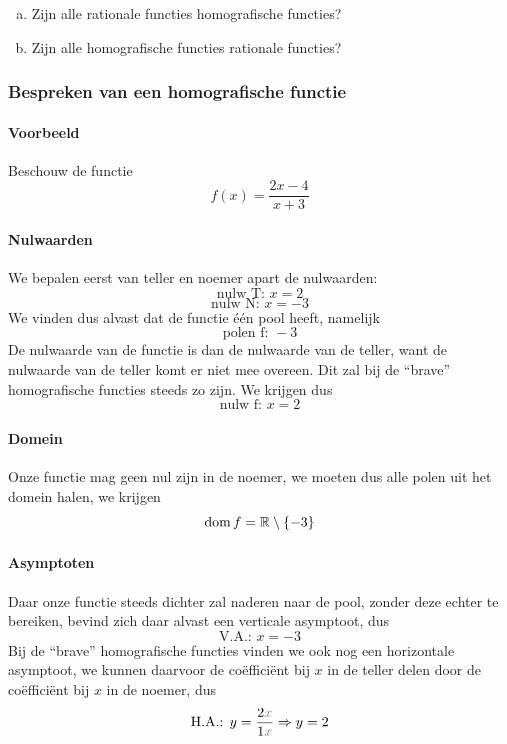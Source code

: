 \documentclass[12pt,twoside,a4paper]{article}
\begin{document}
\begin{oefening}
\begin{enumerate}[(a)]
  \item Zijn alle rationale functies homografische functies?
  \item Zijn alle homografische functies rationale functies?
\end{enumerate}
\end{oefening}

\subsubsection*{Bespreken van een homografische functie}

\paragraph{Voorbeeld} Beschouw de functie
$$f(x)=\dfrac{2x-4}{x+3}$$

\paragraph{Nulwaarden} We bepalen eerst van teller en noemer apart de
nulwaarden:
$$\text{nulw T: } x=2$$
$$\text{nulw N: } x=-3$$
We vinden dus alvast dat de functie één pool heeft, namelijk
$$\text{polen f: } -3$$
De nulwaarde van de functie is dan de nulwaarde van de teller, want de
nulwaarde van de teller komt er niet mee overeen. Dit zal bij de
``brave'' homografische functies steeds zo zijn. We krijgen dus
$$\text{nulw f: } x=2$$

\paragraph{Domein} Onze functie mag geen nul zijn in de noemer, we
moeten dus alle polen uit het domein halen, we krijgen
$$\dom f = \mathbb{R} \setminus \{-3\}$$

\paragraph{Asymptoten} Daar onze functie steeds dichter zal naderen
naar de pool, zonder deze echter te bereiken, bevind zich daar alvast
een verticale asymptoot, dus
$$\text{V.A.: } x=-3$$
Bij de ``brave'' homografische functies vinden we ook nog een
horizontale asymptoot, we kunnen daarvoor de coëfficiënt bij $x$ in de
teller delen door de coëfficiënt bij $x$ in de noemer, dus
$$\text{H.A.: } y=\dfrac{2\color{gray}x}{1\color{gray}x} \Rightarrow y=2$$
\end{document}
